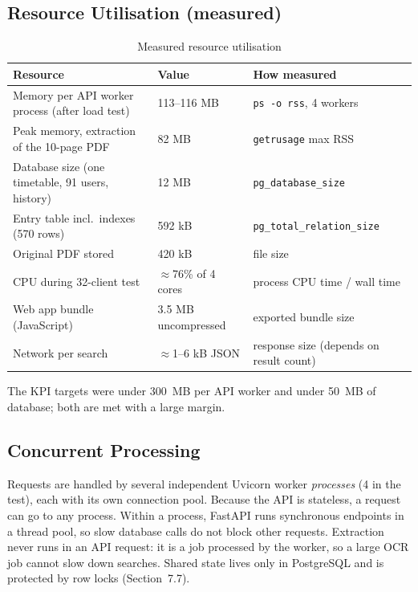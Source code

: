 \subsection{Resource Utilisation (measured)}
\begin{table}[H]
\centering
\caption{Measured resource utilisation}
\label{tab:resources}
\small
\begin{tabularx}{\textwidth}{@{}p{5.4cm}p{3cm}X@{}}
\toprule
\textbf{Resource} & \textbf{Value} & \textbf{How measured}\\
\midrule
Memory per API worker process (after load test) & 113--116 MB & \texttt{ps -o rss}, 4 workers\\
Peak memory, extraction of the 10-page PDF & 82 MB & \texttt{getrusage} max RSS\\
Database size (one timetable, 91 users, history) & 12 MB & \texttt{pg\_database\_size}\\
Entry table incl.\ indexes (570 rows) & 592 kB & \texttt{pg\_total\_relation\_size}\\
Original PDF stored & 420 kB & file size\\
CPU during 32-client test & $\approx$76\% of 4 cores & process CPU time / wall time\\
Web app bundle (JavaScript) & 3.5 MB uncompressed & exported bundle size\\
Network per search & $\approx$1--6 kB JSON & response size (depends on result count)\\
\bottomrule
\end{tabularx}
\end{table}
The KPI targets were under 300~MB per API worker and under 50~MB of database; both are met with a
large margin.

\subsection{Concurrent Processing}
Requests are handled by several independent Uvicorn worker \emph{processes} (4 in the test), each
with its own connection pool. Because the API is stateless, a request can go to any process. Within a
process, FastAPI runs synchronous endpoints in a thread pool, so slow database calls do not block other
requests. Extraction never runs in an API request: it is a job processed by the worker, so a large
OCR job cannot slow down searches. Shared state lives only in PostgreSQL and is protected by row locks
(Section~7.7).

